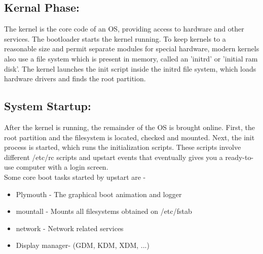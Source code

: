 \documentclass[]{report}
\begin{document}
\subsection{Kernal Phase:}
The kernel is the core code of an OS, providing access to hardware and other services. The bootloader starts the kernel running. To keep kernels to a reasonable size and permit separate modules for special hardware, modern kernels also use a file system which is present in memory, called an 'initrd' or 'initial ram disk'. The kernel launches the init script inside the initrd file system, which loads hardware drivers and finds the root partition.
\subsection{System Startup:}
After the kernel is running, the remainder of the OS is brought online. First, the root partition and the filesystem is located, checked and mounted. Next, the init process is started, which runs the initialization scripts. These scripts involve different /etc/rc scripts and upstart events that eventually gives you a ready-to-use computer with a login screen. 
\\
Some core boot tasks started by upstart are - 
\begin{itemize}
	\item Plymouth - The graphical boot animation and logger
	\item mountall - Mounts all filesystems obtained on /etc/fstab
	\item network - Network related services
	\item Display manager-  (GDM, KDM, XDM, ...)
\end{itemize}
\end{document}
